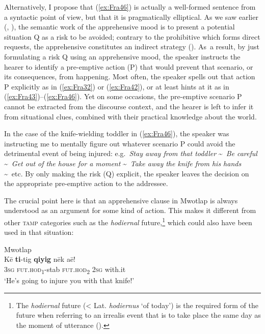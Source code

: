 \documentclass[output=paper,colorlinks,citecolor=brown]{langscibook}
\begin{document}
Alternatively, I propose that (\ref{ex:Fra46}) is actually a well-formed sentence from a syntactic point of view, but that it is pragmatically elliptical. As we saw earlier (, ), the semantic work of the apprehensive mood is to present a potential situation Q as a risk to be avoided; contrary to the prohibitive which forms direct requests, the apprehensive constitutes an indirect strategy (). As~a result, by just formulating a risk Q using an apprehensive mood, the speaker instructs the hearer to identify a pre-emptive action (P) that would prevent that scenario, or its consequences, from happening. Most often, the speaker spells out that action P explicitly as in (\ref{ex:Fra32}) or (\ref{ex:Fra42}), or at least hints at it as in (\ref{ex:Fra43})--(\ref{ex:Fra46}). Yet on some occasions, the pre-emptive scenario P cannot be extracted from the discourse context, and the hearer is left to infer it from situational clues, combined with their practical knowledge about the world.


In the case of the knife-wielding toddler in (\ref{ex:Fra46}), the speaker was instructing me to mentally figure out whatever scenario P could avoid the detrimental event of being injured: e.g.\ \textit{Stay away from that toddler} \textasciitilde\ \textit{Be careful} \textasciitilde\ \textit{Get out of the house for a moment} \textasciitilde\ \textit{Take away the knife from his hands} \textasciitilde\ etc. By only making the risk (Q) explicit, the speaker leaves the decision on the appropriate pre-emptive action to the addressee.



The crucial point here is that an apprehensive clause in Mwotlap is always understood as an argument for some kind of action. This makes it different from other \textsc{tamp} categories such as the \textit{hodiernal} future,\footnote{The \textit{hodiernal} future (< Lat. \textit{hodiernus} `of today') is the required form of the future when referring to an irrealis event that is to take place the same day as the moment of utterance (\citealt[258--269]{francois2003}).} which could also have been used in that situation:

\newpage
\ea \label{ex:Fra47} \textnormal{Mwotlap} \\
\gll Kē \textbf{ti}-tig \textbf{qiyig} nēk aē! \\
\textsc{3sg} \textsc{fut.hod}\textsubscript{1}-stab \textsc{fut.hod}\textsubscript{2} \textsc{2sg} with.it \\
\glt `He's going to injure you with that knife!'
\z
\end{document}
